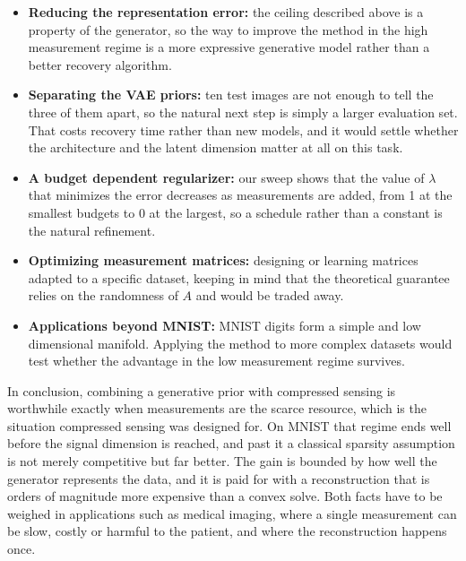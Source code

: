 \begin{itemize}
    \item \textbf{Reducing the representation error:} the ceiling described above is a property of the generator, so the way to improve the method in the high measurement regime is a more expressive generative model rather than a better recovery algorithm.
    \item \textbf{Separating the VAE priors:} ten test images are not enough to tell the three of them apart, so the natural next step is simply a larger evaluation set. That costs recovery time rather than new models, and it would settle whether the architecture and the latent dimension matter at all on this task.
    \item \textbf{A budget dependent regularizer:} our sweep shows that the value of \( \lambda \) that minimizes the error decreases as measurements are added, from 1 at the smallest budgets to 0 at the largest, so a schedule rather than a constant is the natural refinement.
    \item \textbf{Optimizing measurement matrices:} designing or learning matrices adapted to a specific dataset, keeping in mind that the theoretical guarantee relies on the randomness of \( A \) and would be traded away.
    \item \textbf{Applications beyond MNIST:} MNIST digits form a simple and low dimensional manifold. Applying the method to more complex datasets would test whether the advantage in the low measurement regime survives.
\end{itemize}
\vspace{0.01cm}
In conclusion, combining a generative prior with compressed sensing is worthwhile exactly when measurements are the scarce resource, which is the situation compressed sensing was designed for. On MNIST that regime ends well before the signal dimension is reached, and past it a classical sparsity assumption is not merely competitive but far better. The gain is bounded by how well the generator represents the data, and it is paid for with a reconstruction that is orders of magnitude more expensive than a convex solve. Both facts have to be weighed in applications such as medical imaging, where a single measurement can be slow, costly or harmful to the patient, and where the reconstruction happens once.
